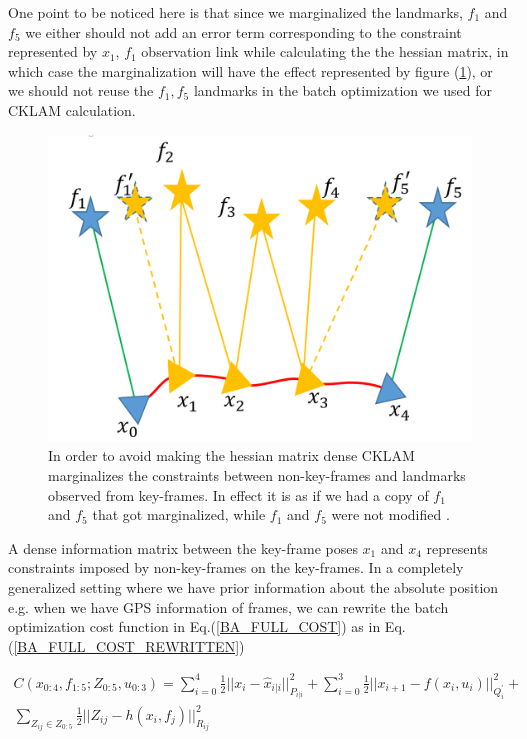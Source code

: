 One point to be noticed here is that since we marginalized the landmarks, $f_1$ and $f_5$ we either should not add an error term corresponding to the constraint represented by $x_1$, $f_1$ observation link while calculating the the hessian matrix, in which case the marginalization will have the effect represented by figure (\ref{fig:CKLAMMarginalizationFeatureClone}), or we should not reuse the $f_1, f_5$ landmarks in the batch optimization we used for CKLAM calculation. 

\begin{figure}[ht]
	\centering
		\includegraphics[width=1.00\textwidth]{images/CKLAMMarginalizationFeatureClone.png}
  \caption{In order to avoid making the hessian matrix dense CKLAM marginalizes the constraints between non-key-frames and landmarks observed from key-frames. In effect it is as if we had a copy of $f_1$ and $f_5$ that got marginalized, while $f_1$ and $f_5$ were not modified \cite{CKLAM}.}
  \label{fig:CKLAMMarginalizationFeatureClone}
\end{figure}

A dense information matrix between the key-frame poses $x_1$ and $x_4$ represents constraints imposed by non-key-frames on the key-frames. In a completely generalized setting where we have prior information about the absolute position e.g. when we have GPS information of frames, we can rewrite the batch optimization cost function in Eq.(\ref{BA_FULL_COST}) as in Eq.(\ref{BA_FULL_COST_REWRITTEN})

\begin{equation}
  \begin{split}
    C(x_{0:4},f_{1:5};Z_{0:5},u_{0:3}) = \sum_{i=0}^4 \frac{1}{2}||x_i-\hat x_{i|i}||^2_{P_{i|i}} + \sum_{i=0}^3 {\frac{1}{2}||x_{i+1} - f(x_i, u_i)||^2_{Q_i^{'}}} +\\ \sum_{Z_{ij}\in Z_{0:5}} {\frac{1}{2}||Z_{ij}-h(x_i,f_j)||^2_{R_{ij}}}
    \label{BA_FULL_COST_REWRITTEN}
  \end{split}
\end{equation}

